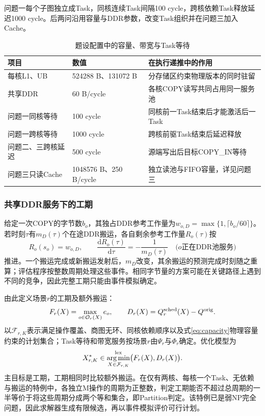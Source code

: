 问题一每个子图独立成Task，同核连续Task间隔100 cycle，跨核依赖Task释放延迟1000 cycle。后两问沿用容量与DDR参数，改变Task组织并在问题三加入Cache。
\begin{table}[H]\centering\caption{题设配置中的容量、带宽与Task等待}\label{tab:q1-hardware}
\begin{tabularx}{\linewidth}{lYY}\toprule
项目 & 数值 & 在执行递推中的作用\\\midrule
每核L1、UB & 524288 B、131072 B & 分存储区约束物理版本的同时驻留\\
共享DDR & 60 B/cycle & 各核COPY读写共同占用同一服务池\\
问题一同核等待 & 100 cycle & 同核前一Task结束后才能激活后一Task\\
问题一跨核等待 & 1000 cycle & 跨核前驱Task结束后延迟释放\\
问题二、三跨核延迟 & 500 cycle & 源端写出后目标COPY\_IN等待\\
问题三只读Cache & 1048576 B、250 B/cycle & 独立读池与FIFO容量，详见问题三\\\bottomrule
\end{tabularx}\end{table}

\subsubsection{共享DDR服务下的工期}
给定一次COPY的字节数$b_o$，其独占DDR参考工作量为$w_{o,D}=\max\{1,\lceil b_o/60\rceil\}$。若时刻$\tau$有$m_D(\tau)$个在途DDR搬运，各自剩余参考工作量$R_o(\tau)$按
\begin{equation}
R_o(s_o)=w_{o,D},\qquad
\frac{\mathrm dR_o(\tau)}{\mathrm d\tau}=-\frac{1}{m_D(\tau)}
\quad\bigl(o\text{正在DDR池服务}\bigr)
\label{eq:ddr-share}
\end{equation}
推进。一个搬运完成或新搬运发射后，$m_D$改变，其余搬运的预测完成时刻随之重算；评估程序按整数周期处理这些事件。相同字节量的方案可能在关键路径上遇到不同的竞争，因此完整工期只能由事件模拟确定。

由此定义场景$r$的工期及额外搬运：
\begin{equation}
F_r(X)=\max_{o\in\mathcal O_r(X)}e_o,\qquad
D_r(X)=Q_r^{\rm sched}(X)-Q^{\rm orig}.
\label{eq:objective}
\end{equation}
以$\mathcal F_{r,K}$表示满足操作覆盖、商图无环、同核依赖顺序以及式\eqref{eq:capacity}物理容量约束的计划集合；Task等待和带宽服务按场景$r$由$\Psi_r$与$\Phi_r$确定。优化模型为
\begin{equation}
X^*_{r,K}\in\operatorname*{arg\,min}^{\rm lex}_{X\in\mathcal F_{r,K}}
\bigl(F_r(X),D_r(X)\bigr).
\label{eq:lex-objective}
\end{equation}
主目标是工期，工期相同时比较额外搬运。在仅有两核、每核一个Task、无依赖与搬运的特例中，各独立M操作的周期为正整数，判定工期能否不超过总周期的一半等价于将这些周期分成两个等和集合，即Partition判定。该特例已是弱NP完全问题，因此求解器生成有限候选，再以事件模拟评价可行计划。


